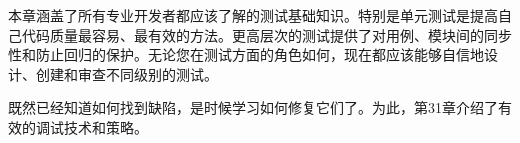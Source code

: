 本章涵盖了所有专业开发者都应该了解的测试基础知识。特别是单元测试是提高自己代码质量最容易、最有效的方法。更高层次的测试提供了对用例、模块间的同步性和防止回归的保护。无论您在测试方面的角色如何，现在都应该能够自信地设计、创建和审查不同级别的测试。

既然已经知道如何找到缺陷，是时候学习如何修复它们了。为此，第31章介绍了有效的调试技术和策略。